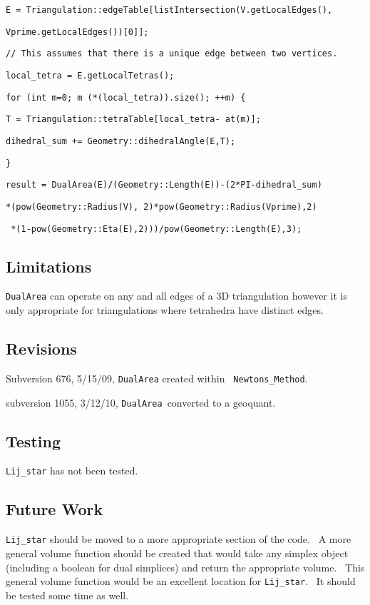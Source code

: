 \qquad\texttt{E =
Triangulation::edgeTable[listIntersection(V.getLocalEdges(),}

\qquad\qquad\texttt{Vprime.getLocalEdges())[0]];}

\qquad\texttt{// This assumes that there is a unique edge between two
vertices.}

\qquad\texttt{local\_tetra = E.getLocalTetras();}

\qquad\texttt{for (int m=0; m \TEXTsymbol{<} (*(local\_tetra)).size(); ++m)
\{}

\qquad\qquad\texttt{T = Triangulation::tetraTable[local\_tetra-\TEXTsymbol{>}%
at(m)];}

\qquad\qquad\texttt{dihedral\_sum += Geometry::dihedralAngle(E,T);}

\qquad\texttt{\}}

\qquad \texttt{result =
DualArea(E)/(Geometry::Length(E))-(2*PI-dihedral\_sum)}

\qquad \qquad \texttt{*(pow(Geometry::Radius(V),
2)*pow(Geometry::Radius(Vprime),2)}

\qquad \qquad \texttt{%
*(1-pow(Geometry::Eta(E),2)))/pow(Geometry::Length(E),3);}

\subsection*{Limitations}

\texttt{DualArea} can operate on any and all edges of a 3D triangulation
however it is only appropriate for triangulations where tetrahedra have
distinct edges. \ 

\subsection*{Revisions}

Subversion 676, 5/15/09, \texttt{DualArea} created within \texttt{%
Newtons\_Method}.

subversion 1055, 3/12/10, \texttt{DualArea}\ converted to a geoquant.

\subsection*{Testing}

\texttt{Lij\_star} has not been tested. \ 

\subsection*{Future Work}

\texttt{Lij\_star} should be moved to a more appropriate section of the
code. \ A more general volume function should be created that would take any
simplex object (including a boolean for dual simplices) and return the
appropriate volume. \ This general volume function would be an excellent
location for \texttt{Lij\_star}. \ It should be tested some time as well. \ 
